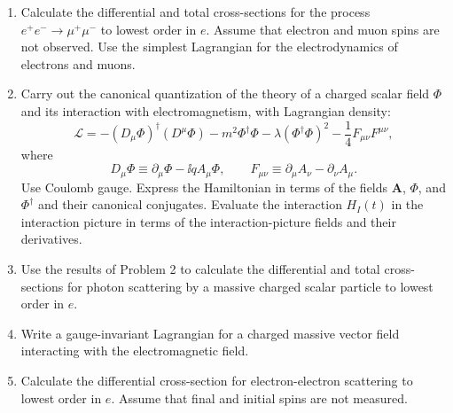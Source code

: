

\begin{enumerate}
\item Calculate the differential and total cross-sections for the process
$e^+e^-\to\mu^+\mu^-$ to lowest order in $e$. Assume that electron and
muon spins are not observed. Use the simplest Lagrangian for the
electrodynamics of electrons and muons.

\item Carry out the canonical quantization of the theory of a charged scalar
field $\Phi$ and its interaction with electromagnetism, with Lagrangian
density:
\begin{equation*}
\mathcal{L}=-(D_\mu\Phi)^\dagger(D^\mu\Phi)
-m^2\Phi^\dagger\Phi-\lambda(\Phi^\dagger\Phi)^2
-\frac14 F_{\mu\nu}F^{\mu\nu},
\end{equation*}
where
\begin{equation*}
D_\mu\Phi\equiv\partial_\mu\Phi-\ii qA_\mu\Phi,
\qquad
F_{\mu\nu}\equiv\partial_\mu A_\nu-\partial_\nu A_\mu.
\end{equation*}
Use Coulomb gauge. Express the Hamiltonian in terms of the fields
$\mathbf{A}$, $\Phi$, and $\Phi^\dagger$ and their canonical conjugates.
Evaluate the interaction $H_I(t)$ in the interaction picture in terms of the
interaction-picture fields and their derivatives.

\item Use the results of Problem 2 to calculate the differential and total
cross-sections for photon scattering by a massive charged scalar particle to
lowest order in $e$.

\item Write a gauge-invariant Lagrangian for a charged massive vector field
interacting with the electromagnetic field.

\item Calculate the differential cross-section for electron-electron
scattering to lowest order in $e$. Assume that final and initial spins are not
measured.
\end{enumerate}


